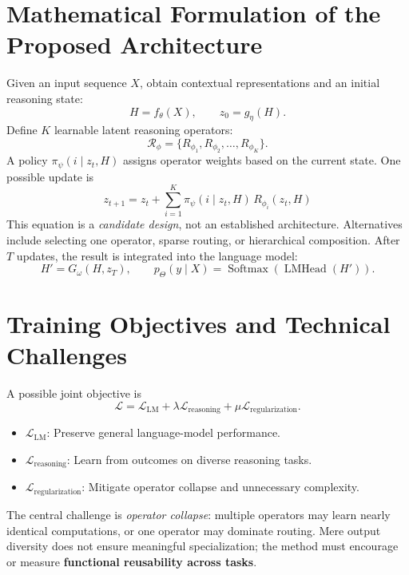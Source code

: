 \documentclass[11pt,a4paper]{article}
\newcommand{\Rset}{\mathcal R_{\phi}}
\newcommand{\loss}{\mathcal L}
\begin{document}
\section{Mathematical Formulation of the Proposed Architecture}
Given an input sequence $X$, obtain contextual representations and an initial reasoning state:
\begin{equation}
H=f_{\theta}(X), \qquad z_0=g_{\eta}(H).
\end{equation}
Define $K$ learnable latent reasoning operators:
\begin{equation}
\Rset=\{R_{\phi_1},R_{\phi_2},\ldots,R_{\phi_K}\}.
\end{equation}
A policy $\pi_\psi(i\mid z_t,H)$ assigns operator weights based on the current state. One possible update is
\begin{equation}
\boxed{z_{t+1}=z_t+\sum_{i=1}^{K}\pi_\psi(i\mid z_t,H)\,R_{\phi_i}(z_t,H)}
\label{eq:update}
\end{equation}
This equation is a \emph{candidate design}, not an established architecture. Alternatives include selecting one operator, sparse routing, or hierarchical composition. After $T$ updates, the result is integrated into the language model:
\begin{equation}
H'=G_{\omega}(H,z_T), \qquad p_{\Theta}(y\mid X)=\operatorname{Softmax}(\operatorname{LMHead}(H')).
\end{equation}

\section{Training Objectives and Technical Challenges}
A possible joint objective is
\begin{equation}
\boxed{\loss=\loss_{\mathrm{LM}}+\lambda\loss_{\mathrm{reasoning}}+\mu\loss_{\mathrm{regularization}}.}
\end{equation}
\begin{itemize}
\item $\loss_{\mathrm{LM}}$: Preserve general language-model performance.
\item $\loss_{\mathrm{reasoning}}$: Learn from outcomes on diverse reasoning tasks.
\item $\loss_{\mathrm{regularization}}$: Mitigate operator collapse and unnecessary complexity.
\end{itemize}
The central challenge is \emph{operator collapse}: multiple operators may learn nearly identical computations, or one operator may dominate routing. Mere output diversity does not ensure meaningful specialization; the method must encourage or measure \textbf{functional reusability across tasks}.
\end{document}
